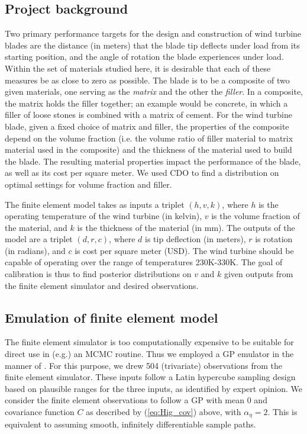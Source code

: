 \documentclass{article}
\begin{document}
\subsection{Project background}

Two primary performance targets for the design and construction of wind turbine blades are the distance (in meters) that the blade tip deflects under load from its starting position, and the angle of rotation the blade experiences under load.
%
Within the set of materials studied here, it is desirable that each of these measures be as close to zero as possible.
%
The blade is to be a composite of two given materials, one serving as the \textit{matrix} and the other the \textit{filler}. 
%
In a composite, the matrix holds the filler together; an example would be concrete, in which a filler of loose stones is combined with a matrix of cement.
%
For the wind turbine blade, given a fixed choice of matrix and filler, the properties of the composite depend on the volume fraction (i.e. the volume ratio of filler material to matrix material used in the composite) and the thickness of the material used to build the blade. 
%
The resulting material properties impact the performance of the blade, as well as its cost per square meter. 
%
We used CDO to find a distribution on optimal settings for volume fraction and filler.

The finite element model takes as inputs a triplet $(h,v,k)$, where $h$ is the operating temperature of the wind turbine (in kelvin), $v$ is the volume fraction of the material, and $k$ is the thickness of the material (in mm). 
%
The outputs of the model are a triplet $(d,r,c)$, where $d$ is tip deflection (in meters), $r$ is rotation (in radians), and $c$ is cost per square meter (USD). 
The wind turbine should be capable of operating over the range of temperatures 230K-330K. 
%
The goal of calibration is thus to find posterior distributions on $v$ and $k$ given outputs from the finite element simulator and desired observations.

\subsection{Emulation of finite element model}\label{emulator}
The finite element simulator is too computationally expensive to be suitable for direct use in (e.g.) an MCMC routine. 
%
Thus we employed a GP emulator in the manner of \cite{Williams2006}. 
%
For this purpose, we drew 504 (trivariate) observations from the finite element simulator. 
%
These inputs follow a Latin hypercube sampling design \citep{McKay1979} based on plausible ranges for the three inputs, as identified by expert opinion.
%
We consider the finite element observations to follow a GP with mean 0 and covariance function $C$ as described by (\ref{eq:Hig_cov}) above, with $\alpha_\eta=2$. 
%
This is equivalent to assuming smooth, infinitely differentiable sample paths. 
%
\end{document}
